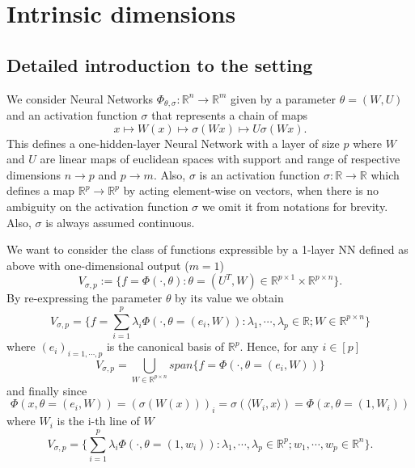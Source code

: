 \documentclass[11pt]{article} %
\begin{document}
\section{Intrinsic dimensions}
\subsection{Detailed introduction to the setting}
We consider Neural Networks $\Phi_{\theta,\sigma}:\mathbb{R}^n\longrightarrow\mathbb{R}^m$ given by a parameter $\theta = (W, U)$ and an activation function $\sigma$ that represents a chain of maps
\begin{equation}
	x \mapsto W(x) \mapsto \sigma(Wx) \mapsto U\sigma(Wx).
\end{equation}
This defines a one-hidden-layer Neural Network with a layer of size $p$ where $W$ and $U$ are linear maps of euclidean spaces with support and range of respective dimensions $n\to p$ and $p\to m$.
Also, $\sigma$ is an activation function $\sigma:\mathbb{R}\to\mathbb{R}$ which defines a map $\mathbb{R}^p\to\mathbb{R}^p$ by acting element-wise on vectors, when there is no ambiguity on the activation function $\sigma$ we omit it from notations for brevity. Also, $\sigma$ is always assumed continuous.
\par
We want to consider the class of functions expressible by a 1-layer NN defined as above with one-dimensional output ($m=1$)
\begin{equation}
	V_{\sigma,p} := \{f= \Phi(\cdot, \theta) : \theta = (U^T, W) \in \mathbb{R}^{p\times 1}\times\mathbb{R}^{p\times n}\}.
\end{equation} 
By re-expressing the parameter $\theta$ by its value we obtain
\begin{equation}
	V_{\sigma,p} = \{f= \sum_{i=1}^p \lambda_i \Phi(\cdot, \theta = (e_i, W)) : \lambda_1,\cdots, \lambda_p \in \mathbb{R}; W\in\mathbb{R}^{p\times n}\}
\end{equation}
where $(e_i)_{i=1,\cdots,p}$ is the canonical basis of $\mathbb{R}^p$. Hence, for any $i\in[p]$
\begin{equation}
	V_{\sigma,p} = \bigcup_{W\in\mathbb{R}^{p\times n}} span\{ f = \Phi(\cdot, \theta = (e_i, W))\}
\end{equation}
and finally since 
\begin{equation}
	\Phi(x, \theta=(e_i, W)) = (\sigma(W(x)))_i = \sigma(\langle W_i, x \rangle) = \Phi(x, \theta=(1, W_i))
\end{equation}
 where $W_i$ is the i-th line of $W$
\begin{equation}
	V_{\sigma, p} = \{\sum_{i=1}^p \lambda_i \Phi(\cdot, \theta=(1,w_i)): \lambda_1,\cdots, \lambda_p \in \mathbb{R}^p; w_1,\cdots, w_p \in \mathbb{R}^n\}.
\end{equation}
\end{document}
